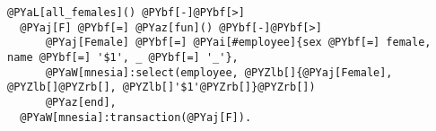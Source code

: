 \begin{Verbatim}[commandchars=@\[\]]
@PYaL[all_females]() @PYbf[-]@PYbf[>]
  @PYaj[F] @PYbf[=] @PYaz[fun]() @PYbf[-]@PYbf[>]
      @PYaj[Female] @PYbf[=] @PYai[#employee]{sex @PYbf[=] female, name @PYbf[=] '$1', _ @PYbf[=] '_'},
      @PYaW[mnesia]:select(employee, @PYZlb[]{@PYaj[Female], @PYZlb[]@PYZrb[], @PYZlb[]'$1'@PYZrb[]}@PYZrb[])
      @PYaz[end],
  @PYaW[mnesia]:transaction(@PYaj[F]).
\end{Verbatim}
